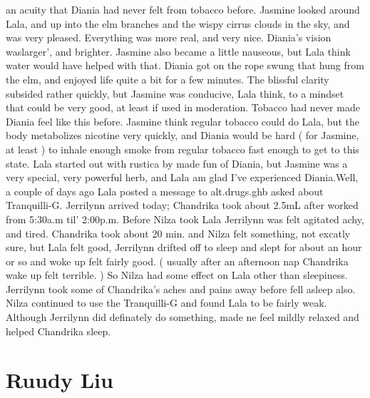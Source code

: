\documentclass[12pt]{book}
\begin{document}
an acuity that Diania had never felt from tobacco before. Jasmine looked around Lala, and up into the elm branches and the wispy cirrus clouds in the sky, and was very pleased. Everything was more real, and very nice. Diania's vision waslarger', and brighter. Jasmine also became a little nauseous, but Lala think water would have helped with that. Diania got on the rope swung that hung from the elm, and enjoyed life quite a bit for a few minutes. The blissful clarity subsided rather quickly, but Jasmine was conducive, Lala think, to a mindset that could be very good, at least if used in moderation. Tobacco had never made Diania feel like this before. Jasmine think regular tobacco could do Lala, but the body metabolizes nicotine very quickly, and Diania would be hard ( for Jasmine, at least ) to inhale enough smoke from regular tobacco fast enough to get to this state. Lala started out with rustica by made fun of Diania, but Jasmine was a very special, very powerful herb, and Lala am glad I've experienced Diania.Well, a couple of days ago Lala posted a message to alt.drugs.ghb asked about Tranquilli-G. Jerrilynn arrived today; Chandrika took about 2.5mL after worked from 5:30a.m til' 2:00p.m. Before Nilza took Lala Jerrilynn was felt agitated achy, and tired. Chandrika took about 20 min. and Nilza felt something, not excatly sure, but Lala felt good, Jerrilynn drifted off to sleep and slept for about an hour or so and woke up felt fairly good. ( usually after an afternoon nap Chandrika wake up felt terrible. ) So Nilza had some effect on Lala other than sleepiness. Jerrilynn took some of Chandrika's aches and pains away before fell asleep also. Nilza continued to use the Tranquilli-G and found Lala to be fairly weak. Although Jerrilynn did definately do something, made ne feel mildly relaxed and helped Chandrika sleep.



\chapter{Ruudy Liu}
\end{document}
